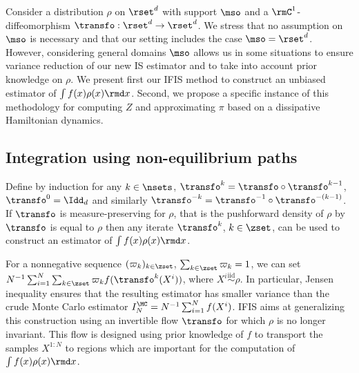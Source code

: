 Consider a distribution $\rho$ on $\rset^{d}$ with
support $\mso$ and a $\rmC^1$-diffeomorphism
$\transfo:\rset^{d}\to \rset^{d}$. We stress that no assumption on
$\mso$ is necessary and that our setting includes the case
$\mso=\rset^d$. However, considering general domains $\mso$ allows us
in some situations to ensure variance reduction of our new IS
estimator and to take into account prior knowledge on $\rho$.  We present first our IFIS method to construct an unbiased
estimator of $\int f(x) \rho(x) \rmd x$. Second, we propose a specific
instance of this methodology for computing $Z$ and
approximating $\pi$ based on a dissipative Hamiltonian dynamics.


\subsection{Integration using non-equilibrium paths} \label{sec:estimator}
 Define by
induction for any $k \in \nsets$, $\transfo^{k}=\transfo\circ\transfo^{k-1}$, $\transfo^{0}=\Idd_{d}$ and similarly $\transfo^{-k}=\transfo^{-1}\circ\transfo^{-(k-1)}$.  
If  $\transfo$ is measure-preserving for $\rho$, that is the pushforward density of $\rho$ by
$\transfo$ is equal to $\rho$
then any iterate $\transfo^k$, $k \in \zset$, can be used to construct
an estimator of $\int f(x) \rho(x) \rmd x$.

For a nonnegative sequence $(\varpi_k)_{k \in\zset}$,
$\sum_{k\in \zset} \varpi_k=1$, we can set
$N^{-1} \sum_{i=1}^N \sum_{k\in \zset} \varpi_k f(\transfo^k(X^i))$,
where $X^{i}\overset{\text{iid}}{\sim}\rho$. In particular, Jensen
inequality ensures that the resulting estimator has smaller variance
than the crude Monte Carlo estimator
$I_N^{\MC}= N^{-1} \sum_{i=1}^Nf(X^i)$.  IFIS aims at generalizing
this construction using an invertible flow
$\transfo$ for which $\rho$ is no longer invariant. This flow is designed
using prior knowledge of $f$ to transport the samples $X^{1:N}$ to
regions which are important for the computation of
$\int f(x) \rho(x) \rmd x$.

